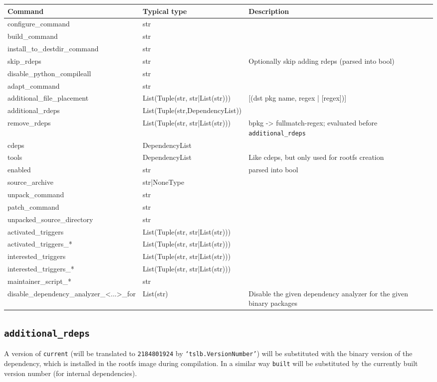 \documentclass[a4paper]{scrartcl}
\newcommand{\python}[1]{\texttt{`#1'}}
\begin{document}
	\begin{tabularx}{\textwidth}{llX}
		Command & Typical type & Description \\
		\hline
		configure\_command & str & \\
		build\_command & str & \\
		install\_to\_destdir\_command & str & \\
		skip\_rdeps & str & Optionally skip adding rdeps (parsed into bool) \\
		disable\_python\_compileall & str & \\
		adapt\_command & str & \\
		additional\_file\_placement & List(Tuple(str, str|List(str))) & [(dst pkg name, regex | [regex])]\\
		additional\_rdeps & List(Tuple(str,DependencyList)) & \\
		remove\_rdeps & List(Tuple(str, str|List(str))) & bpkg -> fullmatch-regex; evaluated before \texttt{additional\_rdeps} \\
		cdeps & DependencyList & \\
		tools & DependencyList&  Like cdeps, but only used for rootfs creation \\
		enabled & str & parsed into bool \\
		source\_archive & str|NoneType & \\
		unpack\_command & str & \\
		patch\_command & str & \\
		unpacked\_source\_directory & str & \\
		activated\_triggers & List(Tuple(str, str|List(str))) & \\
		activated\_triggers\_* & List(Tuple(str, str|List(str))) & \\
		interested\_triggers & List(Tuple(str, str|List(str))) & \\
		interested\_triggers\_* & List(Tuple(str, str|List(str))) & \\
		maintainer\_script\_* & str & \\
		disable\_dependency\_analyzer\_<...>\_for & List(str) & Disable the given dependency analyzer for the given binary packages \\
	\end{tabularx}

	\subsection{\texttt{additional\_rdeps}}
	\label{sec:additional_rdeps}
	
	A version of \texttt{current} (will be translated to \texttt{2184801924} by \python{tslb.VersionNumber}) will be substituted with the binary version of the dependency, which is installed in the rootfs image during compilation. In a similar way \texttt{built} will be substituted by the currently built version number (for internal dependencies).
	
\end{document}
